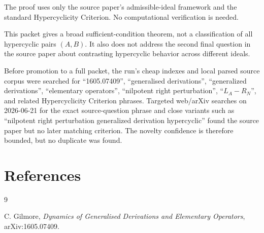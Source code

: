\documentclass[11pt]{article}
\begin{document}
The proof uses only the source paper's admissible-ideal framework and the
standard Hypercyclicity Criterion.  No computational verification is needed.

This packet gives a broad sufficient-condition theorem, not a classification of
all hypercyclic pairs \((A,B)\).  It also does not address the second final
question in the source paper about contrasting hypercyclic behavior across
different ideals.

Before promotion to a full packet, the run's cheap indexes and local parsed
source corpus were searched for ``1605.07409'', ``generalised derivations'',
``generalized derivations'', ``elementary operators'', ``nilpotent right
perturbation'', ``\(L_A-R_N\)'', and related Hypercyclicity Criterion phrases.
Targeted web/arXiv searches on 2026-06-21 for the exact source-question phrase
and close variants such as ``nilpotent right perturbation generalized
derivation hypercyclic'' found the source paper but no later matching
criterion.  The novelty confidence is therefore bounded, but no duplicate was
found.

\section*{References}

\begin{thebibliography}{9}

C. Gilmore,
\emph{Dynamics of Generalised Derivations and Elementary Operators},
arXiv:1605.07409.

\end{thebibliography}
\end{document}
